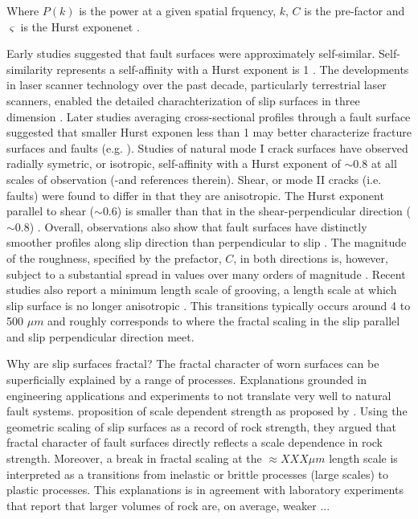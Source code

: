 \documentclass[12pt,a4paper]{article}
\begin{document}
Where $P(k)$ is the power at a given spatial frquency, $k$, $C$ is the pre-factor and $\varsigma$ is the Hurst exponenet \cite{mandelbrot1985self, power1991euclidean, schmittbuhl1993field, candela2012roughness}. 

Early studies suggested that fault surfaces were approximately self-similar. Self-similarity represents a self-affinity with a Hurst exponent is 1 \cite{mandelbrot1985self}. The developments in laser scanner technology over the past decade, particularly terrestrial laser scanners, enabled the detailed charachterization of slip surfaces in three dimension \cite{lee1996structural, kokkalas2007quantitative, renard2006high, sagy2007evolution, sagy2009geometric, jones2009quantitative, bistacchi2011fault, brodsky2011faults, candela2012roughness}. Later studies averaging cross-sectional profiles through a fault surface suggested that smaller Hurst exponen less than 1 may better characterize fracture surfaces and faults (e.g. \cite{schmittbuhl1993field, lee1996structural, sagy2009geometric, candela2012roughness, brodsky2016scale}). Studies of natural mode I crack surfaces have observed radially symetric, or isotropic, self-affinity with a Hurst exponent of $\sim$0.8 at all scales of observation (\cite{schmittbuhl1995scaling, bouchaud1997scaling}-and references therein). Shear, or mode II cracks (i.e. faults) were found to differ in that they are anisotropic. The Hurst exponent parallel to shear ($\sim$0.6) is smaller than that in the shear-perpendicular direction ($\sim$0.8) \cite{lee1996structural, sagy2007evolution, bistacchi2011fault, candela2012roughness}. Overall, observations also show that fault surfaces have distinctly smoother profiles along slip direction than perpendicular to slip \cite{lee1996structural, sagy2007geometric, candela2012roughness}. The magnitude of the roughness, specified by the prefactor, $C$, in both directions is, however, subject to a substantial spread in values over many orders of magnitude \cite{candela2012roughness, brodsky2011faults}. Recent studies also report a minimum length scale of grooving, a length scale at which slip surface is no longer anisotropic \cite{candela2016minimum, brodsky2016constraints}. This transitions typically occurs around 4 to 500 $\mu m$ and roughly corresponds to where the fractal scaling in the slip parallel and slip perpendicular direction meet.

Why are slip surfaces fractal? The fractal character of worn surfaces can be superficially explained by a range of processes. Explanations grounded in engineering applications and experiments to not translate very well to natural fault systems.   proposition of scale dependent strength as proposed by \citet{brodsky2016scale}. Using the geometric scaling of slip surfaces as a record of rock strength, they argued that fractal character of fault surfaces directly reflects a scale dependence in rock strength. Moreover, a break in fractal scaling at the $\approx XXX \mu m$ length scale is interpreted as a transitions from inelastic or brittle processes (large scales) to plastic processes. This explanations is in agreement with laboratory experiments that report that larger volumes of rock are, on average, weaker ...
\end{document}
